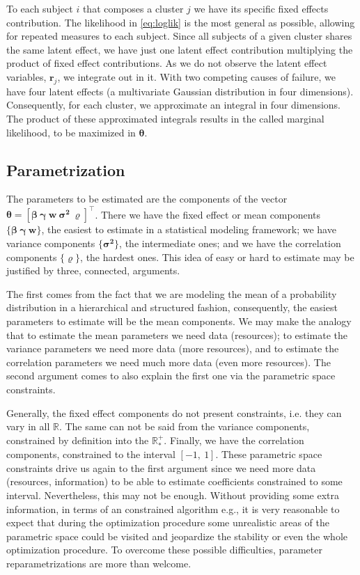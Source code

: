 To each subject \(i\) that composes a cluster \(j\) we have its specific
fixed effects contribution. The likelihood in \autoref{eq:loglik} is the
most general as possible, allowing for repeated measures to each
subject. Since all subjects of a given cluster shares the same latent
effect, we have just one latent effect contribution multiplying the
product of fixed effect contributions. As we do not observe the latent
effect variables, \(\bm{r}_{j}\), we integrate out in it. With two
competing causes of failure, we have four latent effects (a multivariate
Gaussian distribution in four dimensions). Consequently, for each
cluster, we approximate an integral in four dimensions. The product of
these approximated integrals results in the called marginal likelihood,
to be maximized in \(\bm{\theta}\).

\subsection{Parametrization}
\label{cap:parametrization}

The parameters to be estimated are the components of the vector
\(\bm{\theta} = [\bm{\beta}~\bm{\gamma}~\bm{w}~\bm{\sigma^{2}}~
\bm{\varrho}]^{\top}\). There we have the fixed effect or mean
components \(\{\bm{\beta}~\bm{\gamma}~\bm{w}\}\), the easiest to
estimate in a statistical modeling framework; we have variance
components \(\{\bm{\sigma^{2}}\}\), the intermediate ones; and we have
the correlation components \(\{\bm{\varrho}\}\), the hardest ones. This
idea of easy or hard to estimate may be justified by three, connected,
arguments.

The first comes from the fact that we are modeling the mean of a
probability distribution in a hierarchical and structured fashion,
consequently, the easiest parameters to estimate will be the mean
components. We may make the analogy that to estimate the mean parameters
we need data (resources); to estimate the variance parameters we need
more data (more resources), and to estimate the correlation parameters
we need much more data (even more resources). The second argument comes
to also explain the first one via the parametric space constraints.

Generally, the fixed effect components do not present constraints, i.e.
they can vary in all \(\mathbb{R}\). The same can not be said from the
variance components, constrained by definition into the
\(\mathbb{R}_{\ast}^{+}\). Finally, we have the correlation components,
constrained to the interval \([-1,~1]\). These parametric space
constraints drive us again to the first argument since we need more data
(resources, information) to be able to estimate coefficients constrained
to some interval. Nevertheless, this may not be enough. Without
providing some extra information, in terms of an constrained algorithm
e.g., it is very reasonable to expect that during the optimization
procedure some unrealistic areas of the parametric space could be
visited and jeopardize the stability or even the whole optimization
procedure. To overcome these possible difficulties, parameter
reparametrizations are more than welcome.

